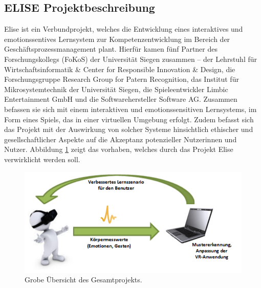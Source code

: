 \subsection{ELISE Projektbeschreibung} \label{elise-subsec}



Elise ist ein Verbundprojekt, welches die Entwicklung eines interaktives und emotionssentives Lernsystem zur Kompetenzentwicklung im Bereich der Geschäftsprozessmanagement plant. 
Hierfür kamen fünf Partner des Forschungskollegs (FoKoS) der Universität Siegen zusammen – der Lehrstuhl für Wirtschaftsinformatik \& Center for Responsible Innovation \& Design, die Forschungsgruppe Research Group for Patern Recognition, das Institut für Mikrosystemtechnik der Universität Siegen, die Spieleentwickler Limbic Entertainment GmbH und die Softwarehersteller Software AG. 
Zusammen befassen sie sich mit einem interaktiven und emotionssensitiven Lernsystems, im Form eines Spiels, das in einer virtuellen Umgebung erfolgt. 
Zudem befasst sich das Projekt mit der Auswirkung von solcher Systeme hinsichtlich ethischer und gesellschaftlicher Aspekte auf die Akzeptanz potenzieller Nutzerinnen und Nutzer. 
Abbildung \ref{fig-elise} zeigt das vorhaben, welches durch das Projekt Elise verwirklicht werden soll.


\begin{figure}[H] \centering
\includegraphics[width=12cm]{Images/elise_projektbeschreibung.png} 
\vspace{-0.3cm} 
\caption{Grobe Übersicht des Gesamtprojekts\cite{msckroenert}.}
\label{fig-elise} 
\end{figure}